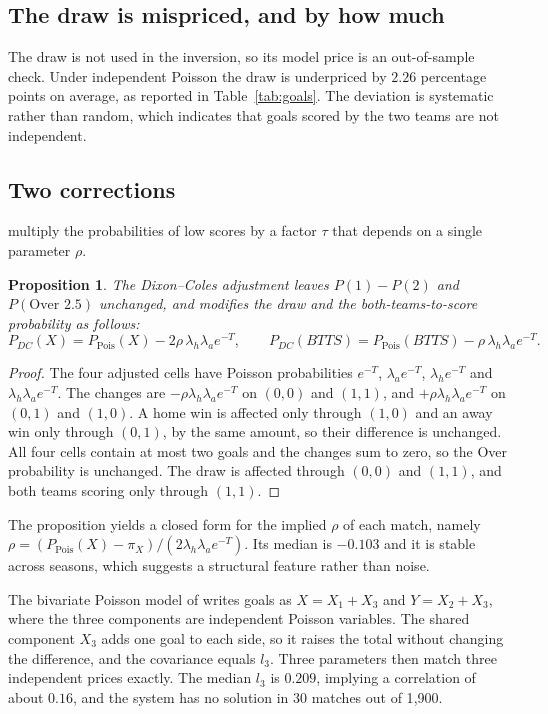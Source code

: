 \documentclass[11pt,a4paper]{article}
\newtheorem{proposition}{Proposition}
\begin{document}
\subsection{The draw is mispriced, and by how much}
The draw is not used in the inversion, so its model price is an out-of-sample check. Under independent
Poisson the draw is underpriced by $2.26$ percentage points on average, as reported in
Table~\ref{tab:goals}. The deviation is systematic rather than random, which indicates that goals
scored by the two teams are not independent.

\subsection{Two corrections}
\citet{dixoncoles1997} multiply the probabilities of low scores by a factor $\tau$ that depends on a
single parameter $\rho$.

\begin{proposition}
The Dixon--Coles adjustment leaves $P(1)-P(2)$ and $P(\text{Over }2.5)$ unchanged, and modifies the
draw and the both-teams-to-score probability as follows:
\[
P_{DC}(X) = P_{\text{Pois}}(X) - 2\rho\,\lambda_h\lambda_a e^{-T}, \qquad
P_{DC}(BTTS) = P_{\text{Pois}}(BTTS) - \rho\,\lambda_h\lambda_a e^{-T}.
\]
\end{proposition}
\begin{proof}
The four adjusted cells have Poisson probabilities $e^{-T}$, $\lambda_a e^{-T}$, $\lambda_h e^{-T}$
and $\lambda_h\lambda_a e^{-T}$. The changes are $-\rho\lambda_h\lambda_a e^{-T}$ on $(0,0)$ and
$(1,1)$, and $+\rho\lambda_h\lambda_a e^{-T}$ on $(0,1)$ and $(1,0)$. A home win is affected only
through $(1,0)$ and an away win only through $(0,1)$, by the same amount, so their difference is
unchanged. All four cells contain at most two goals and the changes sum to zero, so the Over
probability is unchanged. The draw is affected through $(0,0)$ and $(1,1)$, and both teams scoring
only through $(1,1)$.
\end{proof}

The proposition yields a closed form for the implied $\rho$ of each match, namely
$\rho = (P_{\text{Pois}}(X) - \pi_X)/(2\lambda_h\lambda_a e^{-T})$. Its median is $-0.103$ and it is
stable across seasons, which suggests a structural feature rather than noise.

The bivariate Poisson model of \citet{karlis2003} writes goals as $X = X_1 + X_3$ and $Y = X_2 + X_3$,
where the three components are independent Poisson variables. The shared component $X_3$ adds one goal
to each side, so it raises the total without changing the difference, and the covariance equals $l_3$.
Three parameters then match three independent prices exactly. The median $l_3$ is $0.209$, implying a
correlation of about $0.16$, and the system has no solution in 30 matches out of 1{,}900.
\end{document}
